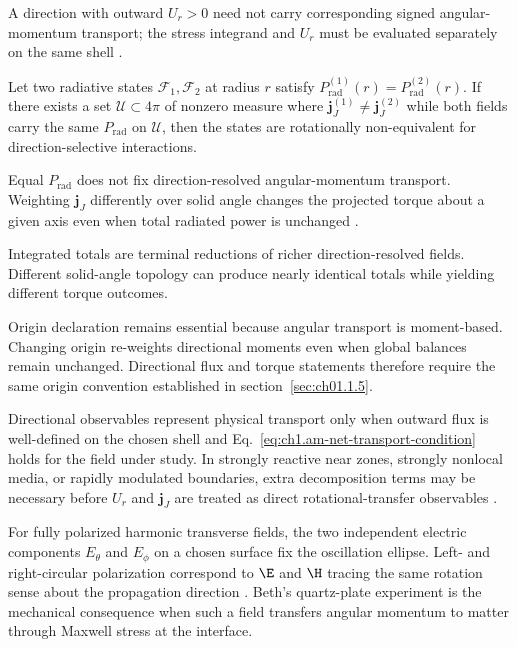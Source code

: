 A direction with outward \(U_r>0\) need not carry corresponding signed angular-momentum transport; the stress integrand and \(U_r\) must be evaluated separately on the same shell \cite{stratton1941,belinfante1940}.

\label{prop:ch1.directional-nonequivalence}
Let two radiative states \(\mathcal{F}_1,\mathcal{F}_2\) at radius \(r\) satisfy
\(P_{\mathrm{rad}}^{(1)}(r)=P_{\mathrm{rad}}^{(2)}(r)\). If there exists a set
\(\mathcal{U}\subset4\pi\) of nonzero measure where
\(\mathbf{j}_J^{(1)}\neq\mathbf{j}_J^{(2)}\) while both fields carry the same \(P_{\mathrm{rad}}\) on \(\mathcal{U}\), then the states are rotationally non-equivalent for
direction-selective interactions.

Equal \(P_{\mathrm{rad}}\) does not fix direction-resolved angular-momentum transport.
Weighting $\mathbf{j}_J$ differently over solid angle changes the projected torque about a given axis even when total radiated power is unchanged \cite{stratton1941}.

Integrated totals are terminal reductions of richer direction-resolved fields. Different solid-angle topology
can produce nearly identical totals while yielding different torque outcomes.

Origin declaration remains essential because angular transport is moment-based.
Changing origin re-weights directional moments even when global balances remain
unchanged. Directional flux and torque statements therefore require the same origin convention established in section~\ref{sec:ch01.1.5}.

Directional observables represent physical transport
only when outward flux is well-defined on the chosen shell and Eq.~\eqref{eq:ch1.am-net-transport-condition} holds for the field under study.
In strongly reactive near zones, strongly nonlocal media, or rapidly modulated
boundaries, extra decomposition terms may be necessary before \(U_r\) and
\(\mathbf{j}_J\) are treated as direct rotational-transfer observables
\cite{stratton1941}.

For fully polarized harmonic transverse fields, the two independent electric
components \(E_\theta\) and \(E_\phi\) on a chosen surface fix the oscillation
ellipse. Left- and right-circular polarization correspond to \(\E\) and \(\H\)
tracing the same rotation sense about the propagation direction
\cite{stratton1941}. Beth's quartz-plate experiment \cite{beth1936} is the
mechanical consequence when such a field transfers angular momentum to matter
through Maxwell stress at the interface.
\label{eq:ch1.polarization-ellipse-angles}
\label{eq:ch1.jones-rotation}
\label{eq:ch1.coherency-matrix}
\label{eq:ch1.polarization-degree}

